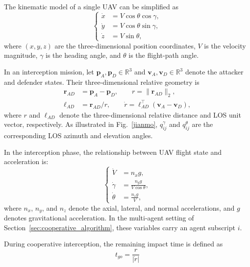 \documentclass[lettersize,journal]{IEEEtran}
\begin{document}
The kinematic model of a single UAV can be simplified as
\begin{equation}
\label{yundongxue3d}
{\left\{\begin{aligned}
\dot{x}&=V\cos\theta\cos\gamma,\\
\dot{y}&=V\cos\theta\sin\gamma,\\
\dot{z}&=V\sin\theta,
\end{aligned}\right.}
\end{equation}
where %
$(x,y,z)$ are the three-dimensional position coordinates, $V$ is the velocity magnitude,
$\gamma$ is the heading angle, and $\theta$ is the flight-path angle.

In an interception mission, let $\mathbf{p}_A,\mathbf{p}_D\in\mathbb{R}^3$ and
$\mathbf{v}_A,\mathbf{v}_D\in\mathbb{R}^3$ denote the attacker and defender states. Their
three-dimensional relative geometry is
\begin{equation}
\label{gongfang3d}
{\begin{aligned}
\mathbf{r}_{AD}&=\mathbf{p}_A-\mathbf{p}_D,\qquad
r=\|\mathbf{r}_{AD}\|_2,\\
\boldsymbol{\ell}_{AD}&=\mathbf{r}_{AD}/r,\qquad
\dot{r}=\boldsymbol{\ell}_{AD}^{\top}(\mathbf{v}_A-\mathbf{v}_D),
\end{aligned}}
\end{equation}
%
where $r$ and $\boldsymbol{\ell}_{AD}$ denote the three-dimensional relative distance
and LOS unit vector, respectively. As illustrated in Fig.~\ref{jianmo},
$q_{ij}^{\gamma}$ and $q_{ij}^{\theta}$ are the corresponding LOS azimuth and elevation angles.

In the interception phase, the relationship between UAV flight state and acceleration is:
\begin{equation}
\label{guozai3d}
{\left\{\begin{aligned}
\dot{V}&=n_x g,\\
\dot{\gamma}&=\frac{n_y g}{V\cos\theta},\\
\dot{\theta}&=\frac{n_z g}{V},
\end{aligned}\right.}
\end{equation}
where $n_x$, $n_y$, and $n_z$ denote the axial, lateral, and normal
accelerations, and $g$ denotes gravitational acceleration.
In the multi-agent setting of Section~\ref{sec:cooperative_algorithm}, these variables carry
an agent subscript $i$.

During cooperative interception, the remaining impact time is defined as
\begin{equation}
\label{shijian}
t_{go}=\frac{r}{\left|\dot{r}\right|}
\end{equation}
\end{document}
